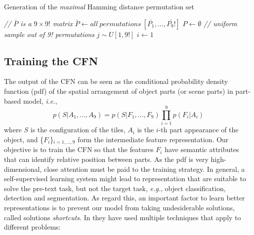 \begin{algorithm}\label{a:hm}
    \caption{Generation of the \textit{maximal} Hamming distance permutation set}
    \BlankLine
    \emph{// $\bar{P}$ is a $9 \times 9!$ matrix\;}
    $\bar{P} \leftarrow all \ permutations \ [\bar{P_1}, ..., \bar{P_9!}]$\;
    $P \leftarrow \emptyset$\;
    \emph{// uniform sample out of 9! permutations}\;
    $j \sim U[1, 9!]$\;
    $i \leftarrow 1 $\;
\end{algorithm}


\subsection{Training the CFN}\label{s:training_CFN}
The output of the CFN can be seen as the conditional probability density function (pdf) of the spatial arrangement of object parts (or scene parts) in part-based model, \emph{i.e.},
\[p(S|A_1, ..., A_9)=p(S|F_1, ..., F_9)\prod_{i=1}^{9}p(F_i|A_i)\]
where $S$ is the configuration of the tiles, $A_i$ is the $i$-th part appearance of the object, and \{${F_i}$\}$_{i=1,...,9}$ form the intermediate feature representation. Our objective is to train the CFN so that the features $F_i$ have semantic attributes that can identify relative position between parts. As the pdf is very high-dimensional, close attention must be paid to the training strategy. In general, a self-supervised learning system might lead to representation that are suitable to solve the pre-text task, but not the target task, \emph{e.g.}, object classification, detection and segmentation. As regard this, an important factor to learn better representations is to prevent our model from taking undesiderable solutions, called solutions \textit{shortcuts}. In \cite{Noroozi_2016} they have used multiple techniques that apply to different problems:


